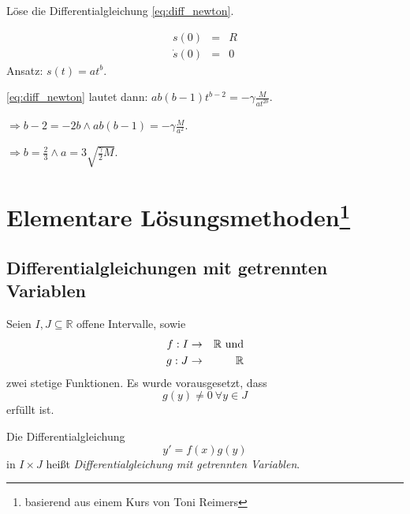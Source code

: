 \documentclass[10pt]{scrbook}
\begin{document}
\begin{Auf}
Löse die Differentialgleichung \eqref{eq:diff_newton}.
\end{Auf}

\begin{Loe}
\begin{eqnarray*}
s(0) & = & R \\
\dot{s}(0) & = & 0
\end{eqnarray*}
Ansatz: $s(t)=a t^b$.

\eqref{eq:diff_newton} lautet dann: $a b (b-1) t^{b-2} = -\gamma \frac{M}{a t^{2 b}}$.

$\Rightarrow b-2=-2 b \wedge a b (b-1)=-\gamma \frac{M}{a^2}$.

$\Rightarrow b=\frac{2}{3} \wedge a=3\sqrt{\frac{\gamma}{2} M}$.
\end{Loe}

\section[Elementare Lösungsmethoden]{Elementare Lösungsmethoden\footnote{basierend aus einem Kurs von Toni Reimers}}

\subsection{Differentialgleichungen mit getrennten Variablen}

\begin{Def}
\label{def:getr_var} 
Seien $I, J\subseteq \mathbb{R}$ offene Intervalle, sowie 
\begin{eqnarray*}
f: I & \rightarrow & \mathbb{R}\textnormal{ und} \\
g: J & \rightarrow & \mathbb{R}
\end{eqnarray*}
zwei stetige Funktionen. Es wurde vorausgesetzt, dass
\begin{displaymath}
g(y)\neq 0\ \forall y\in J
\end{displaymath}
erfüllt ist. 

Die Differentialgleichung
\begin{displaymath}
y'=f(x)g(y)
\end{displaymath}
in $I\times J$ heißt \emph{Differentialgleichung mit getrennten Variablen}.
\end{Def}
\end{document}
